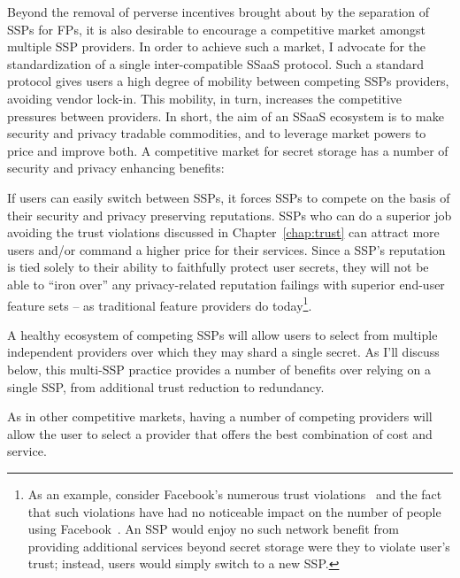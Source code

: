 Beyond the removal of perverse incentives brought about by the
separation of SSPs for FPs, it is also desirable to encourage a
competitive market amongst multiple SSP providers. In order to achieve
such a market, I advocate for the standardization of a single
inter-compatible SSaaS protocol. Such a standard protocol gives users
a high degree of mobility between competing SSPs providers, avoiding
vendor lock-in. This mobility, in turn, increases the competitive
pressures between providers. In short, the aim of an SSaaS ecosystem
is to make security and privacy tradable commodities, and to leverage
market powers to price and improve both. A competitive market for
secret storage has a number of security and privacy enhancing
benefits:

\begin{packed_desc}
\item[Reputation:] If users can easily switch between SSPs, it forces
  SSPs to compete on the basis of their security and privacy
  preserving reputations. SSPs who can do a superior job avoiding the
  trust violations discussed in Chapter~\ref{chap:trust} can attract
  more users and/or command a higher price for their services. Since a
  SSP's reputation is tied solely to their ability to faithfully
  protect user secrets, they will not be able to ``iron over'' any
  privacy-related reputation failings with superior end-user feature
  sets -- as traditional feature providers do today\footnote{As an
    example, consider Facebook's numerous trust
    violations~\cite{goel2014, lomas2014, tsukayama2014} and the fact
    that such violations have had no noticeable impact on the number
    of people using Facebook~\cite{foster2014}. An SSP would enjoy no
    such network benefit from providing additional services beyond
    secret storage were they to violate user's trust; instead, users
    would simply switch to a new SSP.}.
\item[Multiple Providers:] A healthy ecosystem of competing SSPs will
  allow users to select from multiple independent providers over which
  they may shard a single secret. As I'll discuss below, this
  multi-SSP practice provides a number of benefits over relying on a
  single SSP, from additional trust reduction to redundancy.
\item[Cost:] As in other competitive markets, having a number of
  competing providers will allow the user to select a provider that
  offers the best combination of cost and service.
\end{packed_desc}

